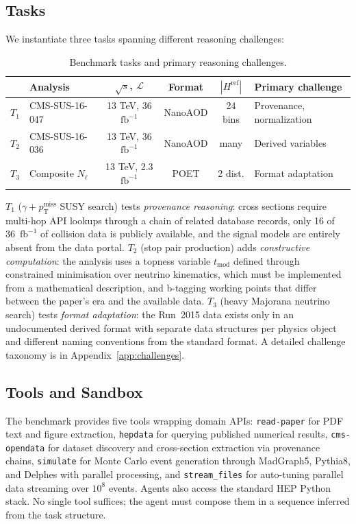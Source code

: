 \documentclass{article}
\newcommand{\pTmiss}{p_{\mathrm{T}}^{\mathrm{miss}}}
\newcommand{\sqrts}{\sqrt{s}}
\newcommand{\fbinv}{\mathrm{fb}^{-1}}
\begin{document}
\subsection{Tasks}

We instantiate three tasks spanning different reasoning challenges:

\begin{table}[h]
\centering
\caption{Benchmark tasks and primary reasoning challenges.}
\label{tab:tasks}
\small
\begin{tabular}{llcccl}
\toprule
& Analysis & $\sqrts$, $\mathcal{L}$ & Format & $|H^{\mathrm{ref}}|$ & Primary challenge \\
\midrule
$T_1$ & CMS-SUS-16-047~\citep{cms_sus_16_047} & 13 TeV, 36 $\fbinv$ & NanoAOD & 24 bins & Provenance, normalization \\
$T_2$ & CMS-SUS-16-036 & 13 TeV, 36 $\fbinv$ & NanoAOD & many & Derived variables \\
$T_3$ & Composite $N_\ell$ & 13 TeV, 2.3 $\fbinv$ & POET & 2 dist. & Format adaptation \\
\bottomrule
\end{tabular}
\end{table}

$T_1$ ($\gamma + \pTmiss$ SUSY search) tests \emph{provenance reasoning}: cross sections require multi-hop API lookups through a chain of related database records, only 16 of 36~$\fbinv$ of collision data is publicly available, and the signal models are entirely absent from the data portal.
$T_2$ (stop pair production) adds \emph{constructive computation}: the analysis uses a topness variable $t_{\mathrm{mod}}$ defined through constrained minimisation over neutrino kinematics, which must be implemented from a mathematical description, and b-tagging working points that differ between the paper's era and the available data.
$T_3$ (heavy Majorana neutrino search) tests \emph{format adaptation}: the Run~2015 data exists only in an undocumented derived format with separate data structures per physics object and different naming conventions from the standard format.
A detailed challenge taxonomy is in Appendix~\ref{app:challenges}.

\subsection{Tools and Sandbox}

The benchmark provides five tools wrapping domain APIs: \texttt{read-paper} for PDF text and figure extraction, \texttt{hepdata} for querying published numerical results, \texttt{cms-opendata} for dataset discovery and cross-section extraction via provenance chains, \texttt{simulate} for Monte Carlo event generation through MadGraph5, Pythia8, and Delphes with parallel processing, and \texttt{stream\_files} for auto-tuning parallel data streaming over $10^8$ events.
Agents also access the standard HEP Python stack.
No single tool suffices; the agent must compose them in a sequence inferred from the task structure.
\end{document}
